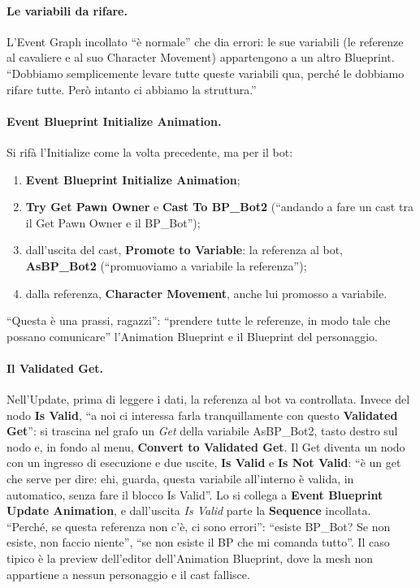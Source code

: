 \paragraph{Le variabili da rifare.} L'Event Graph incollato ``è normale'' che dia errori:
le sue variabili (le referenze al cavaliere e al suo Character Movement) appartengono a
un altro Blueprint. ``Dobbiamo semplicemente levare tutte queste variabili qua, perché le
dobbiamo rifare tutte. Però intanto ci abbiamo la struttura.''

\paragraph{Event Blueprint Initialize Animation.} Si rifà l'Initialize come la volta
precedente, ma per il bot:
\begin{enumerate}
  \item \textbf{Event Blueprint Initialize Animation};
  \item \textbf{Try Get Pawn Owner} e \textbf{Cast To BP\_Bot2} (``andando a fare un cast
        tra il Get Pawn Owner e il BP\_Bot'');
  \item dall'uscita del cast, \textbf{Promote to Variable}: la referenza al bot,
        \textbf{AsBP\_Bot2} (``promuoviamo a variabile la referenza'');
  \item dalla referenza, \textbf{Character Movement}, anche lui promosso a variabile.
\end{enumerate}
``Questa è una prassi, ragazzi'': ``prendere tutte le referenze, in modo tale che possano
comunicare'' l'Animation Blueprint e il Blueprint del personaggio.

\paragraph{Il Validated Get.} Nell'Update, prima di leggere i dati, la referenza al bot va
controllata. Invece del nodo \textbf{Is Valid}, ``a noi ci interessa farla tranquillamente
con questo \textbf{Validated Get}'': si trascina nel grafo un \emph{Get} della variabile
AsBP\_Bot2, tasto destro sul nodo e, in fondo al menu, \textbf{Convert to Validated Get}.
Il Get diventa un nodo con un ingresso di esecuzione e due uscite, \textbf{Is Valid} e
\textbf{Is Not Valid}: ``è un get che serve per dire: ehi, guarda, questa variabile
all'interno è valida, in automatico, senza fare il blocco Is Valid''. Lo si collega a
\textbf{Event Blueprint Update Animation}, e dall'uscita \emph{Is Valid} parte la
\textbf{Sequence} incollata. ``Perché, se questa referenza non c'è, ci sono errori'':
``esiste BP\_Bot? Se non esiste, non faccio niente'', ``se non esiste il BP che mi comanda
tutto''. Il caso tipico è la preview dell'editor dell'Animation Blueprint, dove la mesh non
appartiene a nessun personaggio e il cast fallisce.

